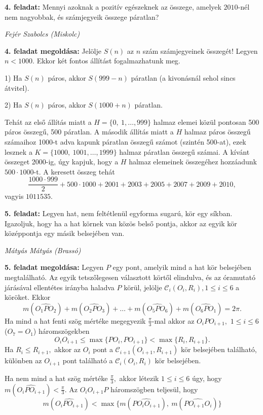 \documentclass[a4paper,10pt]{article}
\def\ki#1#2{\hfill {\it #1 (#2)}\medskip}
\begin{document}
\medskip


{\bf 4. feladat: } Mennyi azoknak a pozitív egészeknek az összege,
amelyek $2010$-nél nem nagyobbak, és számjegyeik összege
páratlan?

\ki{Fejér Szabolcs}{Miskolc}\medskip

\textbf{4. feladat megoldása: } Jelölje $S(n)$ az $n$ szám számjegyeinek összegét! Legyen $n<1000.$
Ekkor két fontos állítást fogalmazhatunk meg.

1) Ha $S(n)$ páros, akkor $S(999-n)$ páratlan (a kivonásnál sehol
sincs átvitel).

2) Ha $S(n)$ páros, akkor $S(1000+n)$ páratlan.

Tehát az első állítás miatt a $H=\{0,\ 1,\dots,999\}$ halmaz elemei
közül pontosan 500 páros összegű, 500 páratlan. A második állítás
miatt a $H$ halmaz páros összegű számaihoz 1000-t adva kapunk
páratlan összegű számot (szintén 500-at), ezek lesznek a $K=\{1000,\
1001,\dots,1999\}$ halmaz páratlan összegű számai. A kívánt összeget
2000-ig, úgy kapjuk, hogy a $H$ halmaz elemeinek összegéhez
hozzáadunk $500\cdot1000$-t. A keresett összeg tehát
\[\frac{1000\cdot999}{2}+500\cdot1000+2001+2003+2005+2007+2009+2010,\] vagyis
$1011535.$

\medskip


{\bf 5. feladat: } Legyen hat, nem feltétlenül egyforma sugarú, kör
egy síkban. Igazoljuk, hogy ha a hat körnek van közös belső pontja, 
akkor az egyik kör középpontja egy másik
belsejében van.

\ki{Mátyás Mátyás}{Brassó}\medskip

\textbf{5. feladat megoldása: } Legyen $P$ egy pont, amelyik mind a hat kör belsejében megtalálható.
Az egyik tetszőlegesen választott körtől elindulva, és az óramutató
járásával ellentétes irányba haladva $P$ körül, jelölje
$\mathcal{C}_i(O_i,R_i),1\leq i\leq 6$ a köröket. Ekkor
\[m(\widehat{O_1PO_2})+m(\widehat{O_2PO_3})+\dots+m(\widehat{O_5PO_6})+m(\widehat{O_6PO_1})=2\pi.\]
Ha mind a hat fenti szög mértéke megegyezik $\frac{\pi}{3}$-mal
akkor az $O_iPO_{i+1},$ $1\leq i\leq 6$ ($O_7=O_1$)
háromszögekben
$$O_iO_{i+1}\leq \max\{PO_i,PO_{i+1}\}<\max \{R_i,R_{i+1}\}.$$  Ha
$R_i\le R_{i+1},$ akkor az $O_i$ pont a
$\mathcal{C}_{i+1}(O_{i+1},R_{i+1})$ kör belsejében található,
különben az $O_{i+1}$ pont található a $\mathcal{C}_i(O_i,R_i)$
kör belsejében.

Ha nem mind a hat szög mértéke $\frac{\pi}{3},$ akkor
létezik $1\leq i\leq 6$ úgy, hogy
$m(\widehat{O_iPO_{i+1}})<\frac{\pi}{3}$. Az $O_iO_{i+1}P$
háromszögben teljesül, hogy
\[m(\widehat{O_iPO_{i+1}})<\max\{m(\widehat{PO_iO_{i+1}}),\ m(\widehat{PO_{i+1}O_i})\}\]
\end{document}
